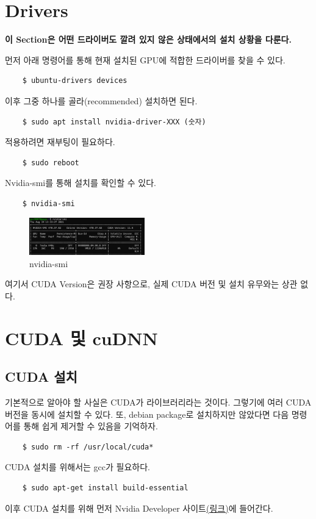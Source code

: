 \section{Drivers}
\textbf{이 Section은 어떤 드라이버도 깔려 있지 않은 상태에서의 설치 상황을 다룬다.}

먼저 아래 명령어를 통해 현재 설치된 GPU에 적합한 드라이버를 찾을 수 있다.
\begin{lstlisting}
    $ ubuntu-drivers devices
\end{lstlisting}
이후 그중 하나를 골라(recommended) 설치하면 된다.
\begin{lstlisting}
    $ sudo apt install nvidia-driver-XXX (숫자)
\end{lstlisting}
적용하려면 재부팅이 필요하다.
\begin{lstlisting}
    $ sudo reboot
\end{lstlisting}
Nvidia-smi를 통해 설치를 확인할 수 있다.
\begin{lstlisting}
    $ nvidia-smi
\end{lstlisting}
\begin{figure}[H]
	\begin{center}
        \includegraphics[width=5cm]{nvidia-smi}
        \caption{nvidia-smi}
    \end{center}
\end{figure}
여기서 CUDA Version은 권장 사항으로, 실제 CUDA 버전 및 설치 유무와는 상관 없다.


\section{CUDA 및 cuDNN}
\subsection{CUDA 설치}
기본적으로 알아야 할 사실은 CUDA가 라이브러리라는 것이다. 그렇기에 여러 CUDA 버전을 동시에 설치할 수 있다. 또, debian package로 설치하지만 않았다면 다음 명령어를 통해 쉽게 제거할 수 있음을 기억하자.
\begin{lstlisting}
    $ sudo rm -rf /usr/local/cuda*
\end{lstlisting}

CUDA 설치를 위해서는 gcc가 필요하다.
\begin{lstlisting}
    $ sudo apt-get install build-essential
\end{lstlisting}
이후 CUDA 설치를 위해 먼저 Nvidia Developer 사이트\href{https://developer.nvidia.com/cuda-toolkit-archive}{(링크)}에 들어간다.

